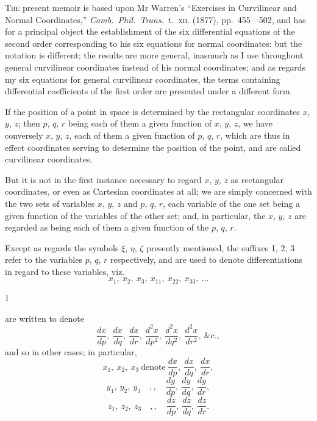 \documentclass[11pt,a4paper]{article}
\providecommand{\textsc}[1]{{\scshape #1}}
\begin{document}
\textsc{The} present memoir is based upon Mr Warren's ``Exercises in Curvilinear and Normal Coordinates,'' \textit{Camb.\ Phil.\ Trans.\ }t.~\textsc{xii}. (1877), pp.~455---502, and has for a principal object the establishment of the six differential equations of the second order corresponding to his six equations for normal coordinates: but the notation is different; the results are more general, inasmuch as I use throughout general curvilinear coordinates instead of his normal coordinates; and as regards my six equations for general curvilinear coordinates, the terms containing differential coefficients of the first order are presented under a different form.

\medskip

If the position of a point in space is determined by the rectangular coordinates $x$, $y$, $z$; then $p$, $q$, $r$ being each of them a given function of $x$, $y$, $z$, we have conversely $x$, $y$, $z$, each of them a given function of $p$, $q$, $r$, which are thus in effect coordinates serving to determine the position of the point, and are called curvilinear coordinates.

\medskip

But it is not in the first instance necessary to regard $x$, $y$, $z$ as rectangular coordinates, or even as Cartesian coordinates at all; we are simply concerned with the two sets of variables $x$, $y$, $z$ and $p$, $q$, $r$, each variable of the one set being a given function of the variables of the other set; and, in particular, the $x$, $y$, $z$ are regarded as being each of them a given function of the $p$, $q$, $r$.

\medskip

Except as regards the symbols $\xi$, $\eta$, $\zeta$ presently mentioned, the suffixes 1, 2, 3 refer to the variables $p$, $q$, $r$ respectively, and are used to denote differentiations in regard to these variables, viz.
\[
x_{1},\ x_{2},\ x_{3},\ x_{11},\ x_{22},\ x_{33},\ \ldots
\]

\vspace{1em}
\noindent\textsc{c.\ xii.}\hfill 1

\clearpage

\fancyhead[C]{\small\textsc{on curvilinear coordinates.}}
\fancyhead[R]{\small [799}

\thispagestyle{plain}
\noindent are written to denote
\[
\frac{dx}{dp},\ \frac{dx}{dq},\ \frac{dx}{dr},\ \frac{d^{2}x}{dp^{2}},\ \frac{d^{2}x}{dq^{2}},\ \frac{d^{2}x}{dr^{2}},\ \&\text{c}.,
\]
and so in other cases; in particular,
\[
x_{1},\ x_{2},\ x_{3}\ \text{denote}\ \frac{dx}{dp},\ \frac{dx}{dq},\ \frac{dx}{dr},
\]
\[
y_{1},\ y_{2},\ y_{3}\quad,,\quad \frac{dy}{dp},\ \frac{dy}{dq},\ \frac{dy}{dr},
\]
\[
z_{1},\ z_{2},\ z_{3}\quad,,\quad \frac{dz}{dp},\ \frac{dz}{dq},\ \frac{dz}{dr}.
\]
\end{document}

